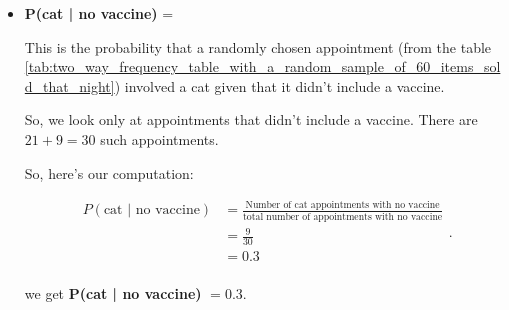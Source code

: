 \begin{itemize}
    We get \textbf{P(cat and no vaccine)} $= 0.15$.

  \item \textbf{P(cat | no vaccine)} = \boxed{ }

    This is the probability that a randomly chosen appointment (from the table
    \ref{tab:two_way_frequency_table_with_a_random_sample_of_60_items_sold_that_night})
    involved a cat given that it didn't include a vaccine.

    So, we look only at appointments that didn't include a vaccine. There are
    $21 + 9 = 30$ such appointments.

    So, here's our computation:

    \begin{equation}
      \label{eqt:cat_no_vaccine}
      \begin{split}
        P(\textrm{cat | no vaccine}) &= \frac{\textrm{Number of cat appointments
          with no vaccine}}{\textrm{total number of appointments with no
          vaccine}} \\
                                     &= \frac{9}{30} \\
                                     &= \boxed{0.3} \\
      \end{split}
    .\end{equation}

    we get \textbf{P(cat | no vaccine)} $= 0.3$.
\end{itemize}

\newpage
